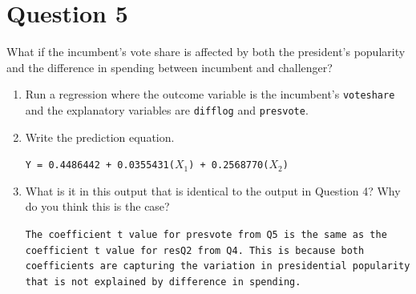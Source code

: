 \documentclass[12pt,letterpaper]{article}
\begin{document}
\section*{Question 5}
\noindent What if the incumbent's vote share is affected by both the president's popularity and the difference in spending between incumbent and challenger? 
	\begin{enumerate}
		\item Run a regression where the outcome variable is the incumbent's \texttt{voteshare} and the explanatory variables are \texttt{difflog} and \texttt{presvote}.
				
		\vspace{1cm}
		\item Write the prediction equation.
		
		\texttt{Y = 0.4486442 + 0.0355431($ X_{1} $) +  0.2568770($ X_{2} $)}	
		\vspace{3cm}
		\item What is it in this output that is identical to the output in Question 4? Why do you think this is the case?
		
		\texttt{The coefficient t value for presvote from Q5 is the same as the coefficient t value for resQ2 from Q4. This is because both coefficients are capturing the variation in presidential popularity that is not explained by difference in spending.}
	\end{enumerate}
\end{document}
